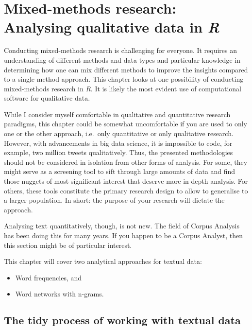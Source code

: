\documentclass[
  letterpaper,
]{krantz}
\begin{document}

\chapter{\texorpdfstring{Mixed-methods research: Analysing qualitative
data in
\emph{R}}{Mixed-methods research: Analysing qualitative data in R}}\label{sec-mixed-methods-research}

Conducting mixed-methods research is challenging for everyone. It
requires an understanding of different methods and data types and
particular knowledge in determining how one can mix different methods to
improve the insights compared to a single method approach. This chapter
looks at one possibility of conducting mixed-methods research in
\emph{R}. It is likely the most evident use of computational software
for qualitative data.

While I consider myself comfortable in qualitative and quantitative
research paradigms, this chapter could be somewhat uncomfortable if you
are used to only one or the other approach, i.e.~only quantitative or
only qualitative research. However, with advancements in big data
science, it is impossible to code, for example, two million tweets
qualitatively. Thus, the presented methodologies should not be
considered in isolation from other forms of analysis. For some, they
might serve as a screening tool to sift through large amounts of data
and find those nuggets of most significant interest that deserve more
in-depth analysis. For others, these tools constitute the primary
research design to allow to generalise to a larger population. In short:
the purpose of your research will dictate the approach.

Analysing text quantitatively, though, is not new. The field of Corpus
Analysis has been doing this for many years. If you happen to be a
Corpus Analyst, then this section might be of particular interest.

This chapter will cover two analytical approaches for textual data:

\begin{itemize}
\item
  Word frequencies, and
\item
  Word networks with n-grams.
\end{itemize}

\section{The tidy process of working with textual
data}\label{sec-tidy-process-for-textual-data}
\end{document}
